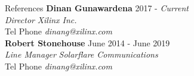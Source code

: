 \documentclass{format/resume} %
\begin{document}
\begin{rSection}{References}
  {\bf Dinan Gunawardena} \hfill {2017 -  \it Current} \\
  {\it Director} \hfill {\it Xilinx Inc.} \\
  Tel Phone \hfill {\it dinang@xilinx.com} \\

  {\bf Robert Stonehouse} \hfill {June 2014 -  June 2019} \\
  {\it Line Manager} \hfill {\it Solarflare Communications} \\
  Tel Phone \hfill {\it dinang@xilinx.com} \\

\end{rSection}

\end{document}
